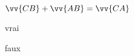 \begin{QCM}
\begin{GroupeQCM}
\begin{exercice}$\vv{CB}+\vv{AB}=\vv{CA}$
\begin{ChoixQCM}{2}
\item vrai
\item faux
\end{ChoixQCM}
\begin{corrige}
\end{corrige}
\end{exercice}



\end{GroupeQCM}
\end{QCM}

  

